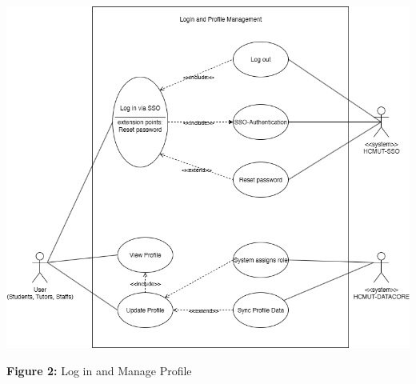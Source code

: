 \begin{center}
\includegraphics[width=0.9\linewidth]{images/UC-01.png}
\end{center}

\begin{center}
\textbf{Figure 2:}  Log in and Manage Profile
\end{center}  


